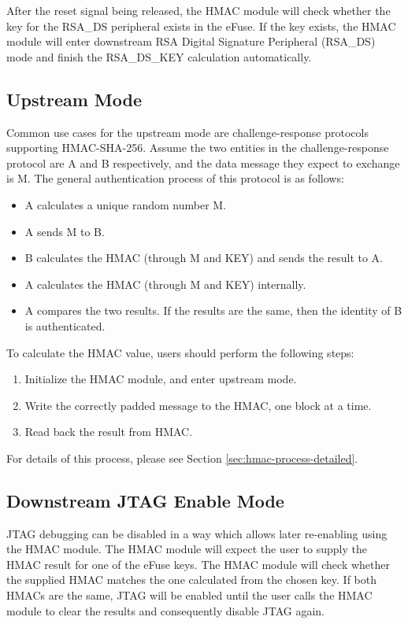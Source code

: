 \documentclass[main\_\_EN.tex]{subfiles}
\begin{document}
After the reset signal being released, the HMAC module will check whether the key for the RSA\_DS peripheral exists in the eFuse. If the key exists, the HMAC module will enter downstream RSA Digital Signature Peripheral (RSA\_DS) mode and finish the RSA\_DS\_KEY calculation automatically.

\subsection{Upstream Mode}
Common use cases for the upstream mode are challenge-response protocols supporting HMAC-SHA-256.
Assume the two entities in the challenge-response protocol are A and B respectively, and the data message they expect to exchange is M. The general authentication process of this protocol is as follows:

\begin{itemize}
    \item A calculates a unique random number M.
    \item A sends M to B.
    \item B calculates the HMAC (through M and KEY) and sends the result to A.
    \item A calculates the HMAC (through M and KEY) internally.
    \item A compares the two results. If the results are the same, then the identity of B is authenticated.
\end{itemize}

To calculate the HMAC value, users should perform the following steps:

\begin{enumerate}
    \item Initialize the HMAC module, and enter upstream mode.
    \item Write the correctly padded message to the HMAC, one block at a time.
    \item Read back the result from HMAC.
\end{enumerate}

For details of this process, please see Section \ref{sec:hmac-process-detailed}.


\subsection{Downstream JTAG Enable Mode}

JTAG debugging can be disabled in a way which allows later re-enabling using the HMAC module. The HMAC module will expect the user to supply the HMAC result for one of the eFuse keys. The HMAC module will check whether the supplied HMAC matches the one calculated from the chosen key. If both HMACs are the same, JTAG will be enabled until the user calls the HMAC module to clear the results and consequently disable JTAG again.
\end{document}
